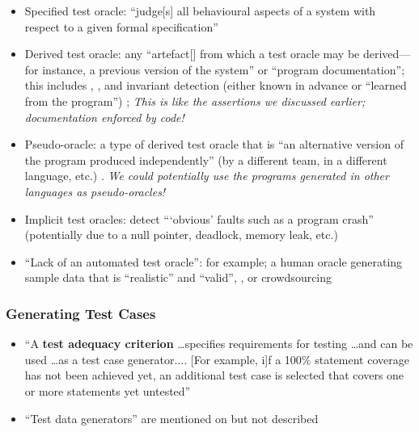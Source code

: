 \begin{itemize}
      \item Specified test oracle: ``judge[s] all behavioural aspects of a
            system with respect to a given formal specification''
            \cite[p.~510]{barr_oracle_2015}
      \item Derived test oracle: any ``artefact[] from which a
            test oracle may be derived---for instance, a previous version of
            the system'' or ``program documentation''; this includes
            ,
            \cite[p.~510]{barr_oracle_2015}, and invariant detection (either
            known in advance or ``learned from the program'')
            \cite[p.~516]{barr_oracle_2015}; \emph{This is like the assertions
                  we discussed earlier; documentation enforced by code!}
      \item Pseudo-oracle: a type of derived test oracle that is ``an
            alternative version of the program produced independently'' (by a
            different team, in a different language, etc.)
            \cite[p.~515]{barr_oracle_2015}. \emph{We could potentially use the
                  programs generated in other languages as pseudo-oracles!}
      \item Implicit test oracles: detect ```obvious' faults such as a program
            crash'' (potentially due to a null pointer, deadlock, memory leak,
            etc.) \cite[p.~510]{barr_oracle_2015}
      \item ``Lack of an automated test oracle'': for example; a human oracle
            generating sample data that is ``realistic'' and ``valid'',
            \cite[pp.~510-511]{barr_oracle_2015}, or crowdsourcing
            \cite[p.~520]{barr_oracle_2015}
\end{itemize}

\subsubsection{Generating Test Cases}

\begin{itemize}
      \item ``A \textbf{test adequacy criterion} \dots specifies requirements
            for testing \dots and can be used \dots as a test case generator....
                  [For example, i]f a 100\% statement coverage has not been achieved
            yet, an additional test case is selected that covers one or more
            statements yet untested'' \cite[p.~402]{van_vliet_software_2000}
      \item ``Test data generators'' are mentioned on
            \cite[p.~410]{van_vliet_software_2000} but not described
\end{itemize}


